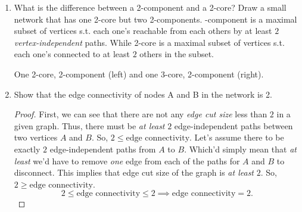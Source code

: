 \documentclass[12pt,a4paper,oneside,draft]{article}
\begin{document}
\begin{enumerate}
\begin{itemize}
\begin{proof}
      \end{proof}
    \end{itemize}
    \item
      What is the difference between a 2-component and a 2-core?
      Draw a small network that has one 2-core but two 2-components.
      \newline
      -component is a maximal subset of vertices s.t. each one's reachable from each others
      by at least $2$ \textit{vertex-independent} paths.
      \newline
      While 2-core is a maximal subset of vertices s.t. each one's connected to at least
      $2$ others in the subset.
      \newline
      \begin{center}
        \newline
        One 2-core, 2-component (left) and one 3-core, 2-component (right).
      \end{center}
    \item
      Show that the edge connectivity of nodes A and B in the network is 2.
      \begin{proof}
        First, we can see that there are not any \textit{edge cut size} less than $2$ in a given graph.
        Thus, there must be \textit{at least} $2$ edge-independent paths between two vertices $A$ and $B$.
        So, $2 \leq \text{edge connectivity}$.
        \newline
        Let's assume there to be exactly $2$ edge-independent paths from $A$ to $B$. Which'd simply mean
        that \textit{at least} we'd have to remove \textit{one} edge from each of the paths for $A$ and $B$
        to disconnect. This implies that edge cut size of the graph is \textit{at least} $2$.
        So, $2 \geq \text{edge connectivity}$.
          $$2 \leq \text{edge connectivity} \leq 2 \implies \text{edge connectivity} = 2.$$
      \end{proof}
\end{enumerate}
\end{document}
